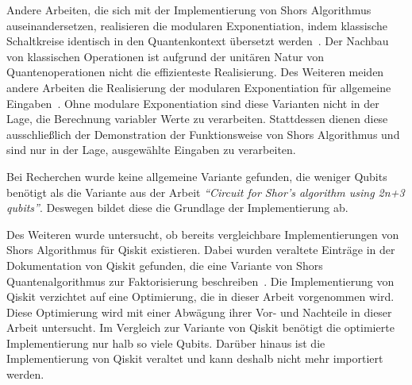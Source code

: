 Andere Arbeiten, die sich mit der Implementierung von Shors Algorithmus auseinandersetzen,
realisieren die modularen Exponentiation, 
indem klassische Schaltkreise identisch in den Quantenkontext übersetzt werden~\cite{Vedral_1996}.
Der Nachbau von klassischen Operationen ist aufgrund der unitären Natur von Quantenoperationen nicht die effizienteste Realisierung.
Des Weiteren meiden andere Arbeiten die Realisierung der modularen Exponentiation für allgemeine Eingaben~\cite{9376169,9686492}. 
Ohne modulare Exponentiation sind diese Varianten nicht in der Lage, 
die Berechnung variabler Werte zu verarbeiten.
Stattdessen dienen diese ausschließlich der Demonstration der Funktionsweise von Shors Algorithmus und
sind nur in der Lage, ausgewählte Eingaben zu verarbeiten.

Bei Recherchen wurde keine allgemeine Variante gefunden,
die weniger Qubits benötigt als die Variante aus der Arbeit \textit{"`Circuit for Shor’s algorithm using 2n+3 qubits"'}.
Deswegen bildet diese die Grundlage der Implementierung ab.

Des Weiteren wurde untersucht, 
ob bereits vergleichbare Implementierungen von Shors Algorithmus für Qiskit existieren. 
Dabei wurden veraltete Einträge in der Dokumentation von Qiskit gefunden, 
die eine Variante von Shors Quantenalgorithmus zur Faktorisierung beschreiben~\cite{QiskitShorImplementations}. 
Die Implementierung von Qiskit verzichtet auf eine Optimierung, die in dieser Arbeit vorgenommen wird. 
Diese Optimierung wird mit einer Abwägung ihrer Vor- und Nachteile in dieser Arbeit untersucht. 
Im Vergleich zur Variante von Qiskit benötigt die optimierte Implementierung nur halb so viele Qubits. 
Darüber hinaus ist die Implementierung von Qiskit veraltet und kann deshalb nicht mehr importiert werden.